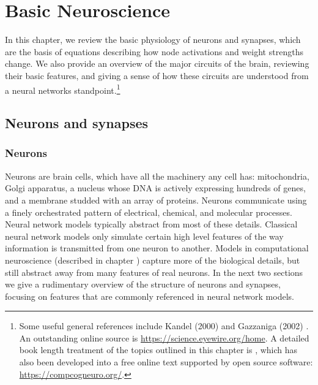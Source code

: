 \chapter{Basic Neuroscience}\label{ch_neuro}



In this chapter, we review the basic physiology of neurons and synapses, which are the basis of equations describing how node activations and weight strengths change. We also provide an overview of the major circuits of the brain, reviewing their basic features, and giving a sense of how these circuits are understood from a neural networks standpoint.\footnote{Some useful general references include Kandel (2000) \cite{kandel2000principles} and Gazzaniga (2002) \cite{gazzaniga2002cognitive}. An outstanding online source is \url{https://science.eyewire.org/home}. A detailed book length treatment of the topics outlined in this chapter is \cite{cecn_4e}, which has also been developed into a free online text supported by open source software: \url{https://compcogneuro.org/}.}  

\section{Neurons and synapses}\label{neuronsSynapses}

\subsection{Neurons}

Neurons are brain cells, which have all the machinery any cell has: mitochondria, Golgi apparatus, a nucleus whose DNA is actively expressing hundreds of genes, and a membrane studded with an array of proteins. Neurons communicate using a finely orchestrated pattern of electrical, chemical, and molecular processes. Neural network models typically abstract from most of these details. Classical neural network models only simulate certain high level features of the way information is transmitted from one neuron to another. Models in computational neuroscience (described in chapter ) capture more of the biological details, but still abstract away from many features of real neurons. In the next two sections we give a rudimentary overview of the structure of neurons and synapses, focusing on features that are commonly referenced in neural network models.

